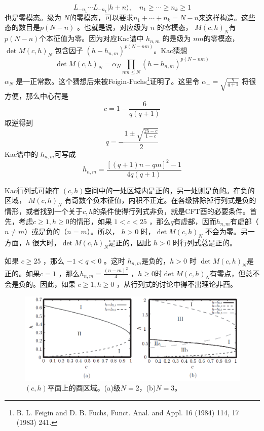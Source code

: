 $$
L_{-n_{1}} \cdots L_{-n_{k}}|h+n\rangle, \quad n_{1} \geq \cdots \geq n_{k}\geq 1
$$
也是零模态。级为 $N $的零模态，可以要求$ n_{1}+\cdots+n_{k}=N-n $来这样构造。这些态的数目是$ p(N-n)$ 。也就是说，对应级为 $n$ 的零模态， $M(c, h)_{N} $有 $p(N-n) $个本征值为零。因为对应Kac谱中 $h_{n,m}$ 的是级为 $nm $的零模态， $\det M(c, h)_{N}$ 包含因子 $\left(h-h_{n, m}\right)^{p(N-n m)} $。Kac猜想
\begin{equation}
	\operatorname{det} M(c, h)_{N}=\alpha_{N} \prod_{n m \leq N}\left(h-h_{n, m}\right)^{p(N-n m)}
\end{equation} 
$\alpha_N$ 是一正常数。这个猜想后来被Feigin-Fuchs\footnote{B. L. Feigin and D. B. Fuchs, Funct. Anal. and Appl. 16 (1984) 114, 17 (1983) 241.}证明了。这里令 $\alpha_{-}=\sqrt{\frac{q}{q+1}}$ 将很方便，那么中心荷是
\begin{equation}
	c=1-\frac{6}{q(q+1)}
\end{equation}
取逆得到
\begin{equation}
	q=-\frac{1 \pm \sqrt{\frac{25-c}{1-c}}}{2}
\end{equation}
Kac谱中的 $h_{n,m}$可写成
\begin{equation}
	h_{n, m}=\frac{[(q+1) n-q m]^{2}-1}{4 q(q+1)}
\end{equation}

Kac行列式可能在 $(c,h) $空间中的一处区域内是正的，另一处则是负的。在负的区域， $M(c, h)_{N}$ 有奇数个负本征值，内积不正定。在各级排除掉行列式是负的情形，或者找到一个关于$ c,h $的条件使得行列式非负，就是CFT酉的必要条件。首先，考虑$ c\geq1,h\geq 0 $的情形，如果 $1<c<25$ ，那么$q $有虚部，因而$ h_{n,m} $有虚部（ $n\neq m $）或是负的（$ n=m $）。所以， $h>0$ 时，$ \det M(c, h)_{N}$ 不会为零。另一方面，$ h$ 很大时，$\det M(c, h)_{N} $是正的，因此 $h>0$ 时行列式总是正的。

如果 $c\geq 25$ ，那么 $-1<q<0$ 。这时 $h_{n,m} $是负的，$ h>0$ 时 $\det M(c, h)_{N}$是正的。如果$ c=1$ ，那么$ h_{n, m}=\frac{(n-m)^{2}}{4}$ ，$ h\geq 0 $时$ \det M(c, h)_{N} $有零点，但总不会是负的。因此，如果 $c\geq1,h\geq 0$ ，从行列式的讨论中得不出理论非酉。

\begin{figure}[h]
	\centering
	\includegraphics[width=0.7\linewidth]{fig/5.2.png}
	\caption{$(c,h)$平面上的酉区域。(a)级$N=2$，(b)$N=3$。}
\end{figure}

